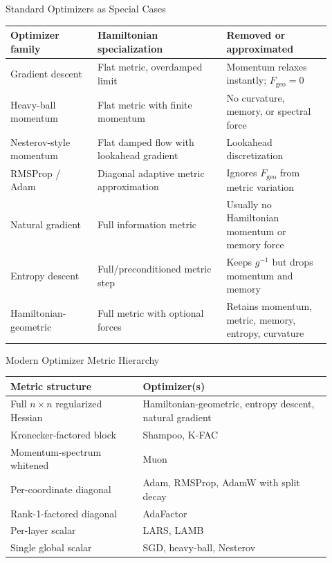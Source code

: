 \documentclass[aspectratio=169,11pt]{beamer}
\begin{document}
\begin{frame}{Standard Optimizers as Special Cases}
  \scriptsize
  \begin{tabular}{@{}p{0.25\linewidth}p{0.37\linewidth}p{0.30\linewidth}@{}}
    \toprule
    Optimizer family & Hamiltonian specialization & Removed or approximated \\
    \midrule
    Gradient descent & Flat metric, overdamped limit & Momentum relaxes instantly; $F_{\mathrm{geo}}=0$ \\
    Heavy-ball momentum & Flat metric with finite momentum & No curvature, memory, or spectral force \\
    Nesterov-style momentum & Flat damped flow with lookahead gradient & Lookahead discretization \\
    RMSProp / Adam & Diagonal adaptive metric approximation & Ignores $F_{\mathrm{geo}}$ from metric variation \\
    Natural gradient & Full information metric & Usually no Hamiltonian momentum or memory force \\
    Entropy descent & Full/preconditioned metric step & Keeps $g^{-1}$ but drops momentum and memory \\
    Hamiltonian-geometric & Full metric with optional forces & Retains momentum, metric, memory, entropy, curvature \\
    \bottomrule
  \end{tabular}
\end{frame}

\begin{frame}{Modern Optimizer Metric Hierarchy}
  \scriptsize
  \begin{tabular}{@{}p{0.38\linewidth}p{0.54\linewidth}@{}}
    \toprule
    Metric structure & Optimizer(s) \\
    \midrule
    Full $n\times n$ regularized Hessian & Hamiltonian-geometric, entropy descent, natural gradient \\
    Kronecker-factored block & Shampoo, K-FAC \\
    Momentum-spectrum whitened & Muon \\
    Per-coordinate diagonal & Adam, RMSProp, AdamW with split decay \\
    Rank-1-factored diagonal & AdaFactor \\
    Per-layer scalar & LARS, LAMB \\
    Single global scalar & SGD, heavy-ball, Nesterov \\
    \bottomrule
  \end{tabular}
  \vspace{0.8em}

\end{frame}
\end{document}
